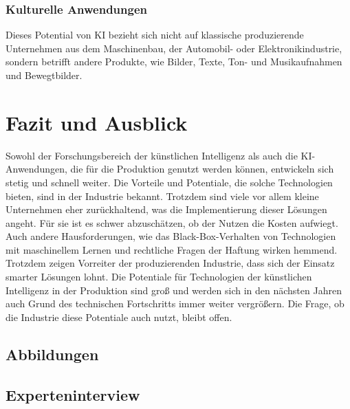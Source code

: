 \documentclass[a4paper,12pt, german]{report}
\begin{document}
\subsection{Kulturelle Anwendungen}
Dieses Potential von KI bezieht sich nicht auf klassische produzierende Unternehmen aus dem Maschinenbau, der Automobil- oder Elektronikindustrie, sondern betrifft andere Produkte, wie Bilder, Texte, Ton- und Musikaufnahmen und Bewegtbilder. 


\chapter{Fazit und Ausblick}

Sowohl der Forschungsbereich der künstlichen Intelligenz als auch die KI-Anwendungen, die für die Produktion genutzt werden können, entwickeln sich stetig und schnell weiter. Die Vorteile und Potentiale, die solche Technologien bieten, sind in der Industrie bekannt. Trotzdem sind viele vor allem kleine Unternehmen eher zurückhaltend, was die Implementierung dieser Lösungen angeht. Für sie ist es schwer abzuschätzen, ob der Nutzen die Kosten aufwiegt. Auch andere Hausforderungen, wie das Black-Box-Verhalten von Technologien mit maschinellem Lernen und rechtliche Fragen der Haftung wirken hemmend. Trotzdem zeigen Vorreiter der produzierenden Industrie, dass sich der Einsatz smarter Lösungen lohnt. Die Potentiale für Technologien der künstlichen Intelligenz in der Produktion sind groß und werden sich in den nächsten Jahren auch Grund des technischen Fortschritts immer weiter vergrößern. Die Frage, ob die Industrie diese Potentiale auch nutzt, bleibt offen.

\listoffigures

\clearpage




\appendix
\section{Abbildungen}



\section{Experteninterview}
\end{document}
